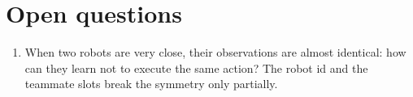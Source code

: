 \documentclass[11pt,a4paper]{article}
\begin{document}
\section*{Open questions}

\begin{enumerate}
\item When two robots are very close, their observations are almost
identical: how can they learn not to execute the same action? The robot id
and the teammate slots break the symmetry only partially.
\end{enumerate}



\end{document}
